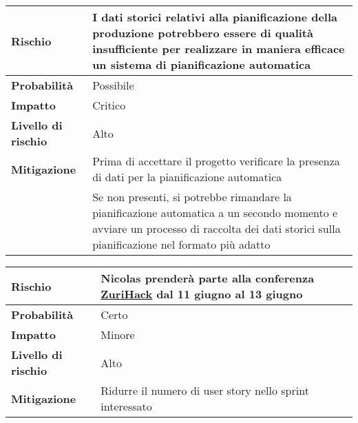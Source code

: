 \begin{table}[H]
  \begin{tabularx}{\textwidth}{lX}
    \toprule
    \textbf{Rischio}            & \textbf{I dati storici relativi alla pianificazione della produzione potrebbero essere di qualità insufficiente per realizzare in maniera efficace un sistema di pianificazione automatica} \\
    \midrule
    \textbf{Probabilità}        & Possibile                                                                                                                                                                                   \\
    \textbf{Impatto}            & Critico                                                                                                                                                                                     \\
    \textbf{Livello di rischio} & Alto                                                                                                                                                                                        \\
    \textbf{Mitigazione}        & Prima di accettare il progetto verificare la presenza di dati per la pianificazione automatica                                                                                              \\
                                & Se non presenti, si potrebbe rimandare la pianificazione automatica a un secondo momento e avviare un processo di raccolta dei dati storici sulla pianificazione nel formato più adatto     \\
    \bottomrule
  \end{tabularx}
\end{table}

\begin{table}[H]
  \begin{tabularx}{\textwidth}{lX}
    \toprule
    \textbf{Rischio}            & \textbf{Nicolas prenderà parte alla conferenza \href{https://zfoh.ch/zurihac2022/}{ZuriHack} dal 11 giugno al 13 giugno} \\
    \midrule
    \textbf{Probabilità}        & Certo                                                                                                                    \\
    \textbf{Impatto}            & Minore                                                                                                                   \\
    \textbf{Livello di rischio} & Alto                                                                                                                     \\
    \textbf{Mitigazione}        & Ridurre il numero di user story nello sprint interessato                                                                 \\
    \bottomrule
  \end{tabularx}
\end{table}


